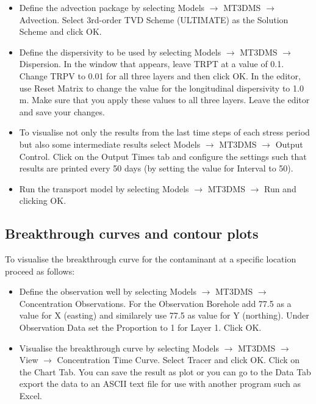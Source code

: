 \begin{itemize}
\item Define the advection package by selecting Models $\rightarrow$ MT3DMS $\rightarrow$ Advection. Select 3rd-order TVD Scheme (ULTIMATE) as the Solution Scheme and click OK.

\item Define the dispersivity to be used by selecting Models $\rightarrow$ MT3DMS $\rightarrow$ Dispersion. In the window that appears, leave TRPT at a value of 0.1.
Change TRPV to 0.01 for all three layers and then click OK. 
In the editor, use Reset Matrix to change the value for 
the longitudinal dispersivity to 1.0 m. 
Make sure that you apply these values to all three layers.
Leave the editor and save your changes. 

\item To visualise not only the results from the last time steps of each stress period but also some intermediate results select Models $\rightarrow$ MT3DMS $\rightarrow$ Output Control. Click on the Output Times tab and configure the settings such that results are printed every 50 days (by setting the value for Interval to 50).

\item Run the transport model by selecting Models $\rightarrow$ MT3DMS $\rightarrow$ Run and clicking OK.

\end{itemize}

\subsection{Breakthrough curves and contour plots}

To visualise the breakthrough curve for the contaminant at a specific
location proceed as follows:

\begin{itemize}

\item Define the observation well by selecting Models $\rightarrow$ MT3DMS $\rightarrow$ Concentration Observations. For the Observation Borehole add 77.5 as a value for X (easting) and similarely use 77.5 as value for Y (northing). Under Observation Data set the Proportion
to 1 for Layer 1. Click OK.

\item Visualise the breakthrough curve by selecting Models $\rightarrow$ MT3DMS $\rightarrow$
View $\rightarrow$ Concentration Time Curve. Select Tracer and click OK. Click on the Chart Tab.
You can save the result as plot or you can go to the Data Tab export the data to an ASCII text file for use with another program such as Excel.

\end{itemize}

